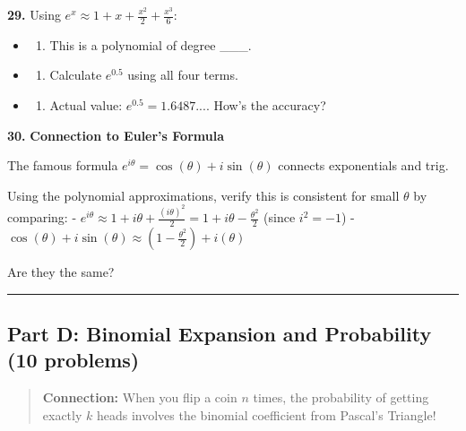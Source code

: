 \documentclass[
  11pt,
]{article}
\providecommand{\tightlist}{%
  \setlength{\itemsep}{0pt}\setlength{\parskip}{0pt}}
\begin{document}
\textbf{29.} Using
\(e^x \approx 1 + x + \frac{x^2}{2} + \frac{x^3}{6}\):

\begin{itemize}
\item
  \begin{enumerate}
  \def\labelenumi{(\alph{enumi})}
  \tightlist
  \item
    This is a polynomial of degree \_\_\_.
  \end{enumerate}
\item
  \begin{enumerate}
  \def\labelenumi{(\alph{enumi})}
  \setcounter{enumi}{1}
  \tightlist
  \item
    Calculate \(e^{0.5}\) using all four terms.
  \end{enumerate}
\item
  \begin{enumerate}
  \def\labelenumi{(\alph{enumi})}
  \setcounter{enumi}{2}
  \tightlist
  \item
    Actual value: \(e^{0.5} = 1.6487...\). How's the accuracy?
  \end{enumerate}
\end{itemize}

\textbf{30.} \textbf{Connection to Euler's Formula}

The famous formula \(e^{i\theta} = \cos(\theta) + i\sin(\theta)\)
connects exponentials and trig.

Using the polynomial approximations, verify this is consistent for small
\(\theta\) by comparing: -
\(e^{i\theta} \approx 1 + i\theta + \frac{(i\theta)^2}{2} = 1 + i\theta - \frac{\theta^2}{2}\)
(since \(i^2 = -1\)) -
\(\cos(\theta) + i\sin(\theta) \approx \left(1 - \frac{\theta^2}{2}\right) + i(\theta)\)

Are they the same?

\begin{center}\rule{0.5\linewidth}{0.5pt}\end{center}

\hypertarget{part-d-binomial-expansion-and-probability-10-problems}{%
\subsection{Part D: Binomial Expansion and Probability (10
problems)}\label{part-d-binomial-expansion-and-probability-10-problems}}

\begin{quote}
\textbf{Connection:} When you flip a coin \(n\) times, the probability
of getting exactly \(k\) heads involves the binomial coefficient from
Pascal's Triangle!
\end{quote}
\end{document}
